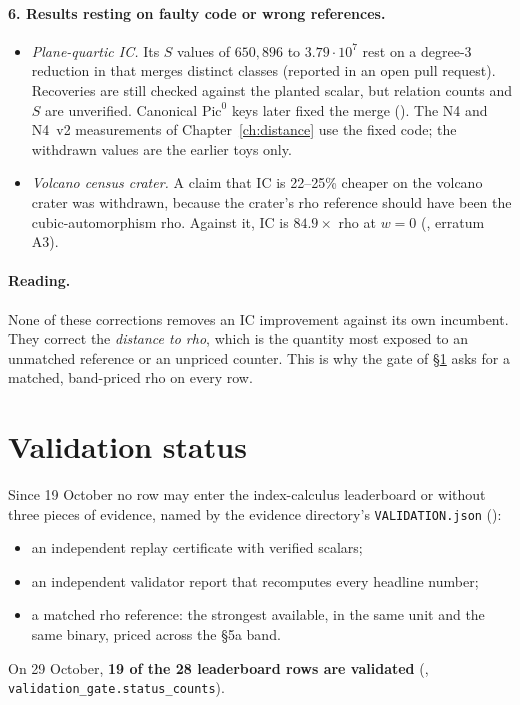 \paragraph{6. Results resting on faulty code or wrong references.}
\begin{itemize}
\item \emph{Plane-quartic IC.} Its $S$ values of $650{,}896$ to
  $3.79\cdot10^7$ rest on a degree-3 reduction in
   that merges
  distinct classes (reported in an open pull request). Recoveries are still
  checked against the planted scalar, but relation counts and $S$ are
  unverified. Canonical $\mathrm{Pic}^0$ keys later fixed the merge
  (). The N4 and N4~v2
  measurements of Chapter~\ref{ch:distance} use the fixed code; the
  withdrawn values are the earlier toys only.
\item \emph{Volcano census crater.} A claim that IC is 22--25\% cheaper on
  the volcano crater was withdrawn, because the crater's rho reference
  should have been the cubic-automorphism rho. Against it, IC is
  $84.9\times$ rho at $w=0$
  (, erratum A3).
\end{itemize}

\paragraph{Reading.} None of these corrections removes an IC improvement
against its own incumbent. They correct the \emph{distance to rho}, which
is the quantity most exposed to an unmatched reference or an unpriced
counter. This is why the gate of \S\ref{sec:gate} asks for a matched,
band-priced rho on every row.

\section{Validation status}\label{sec:gate}

Since 19 October no row may enter the index-calculus leaderboard or
 without three pieces of evidence, named by the
evidence directory's \texttt{VALIDATION.json}
():
\begin{itemize}
\item an independent replay certificate with verified scalars;
\item an independent validator report that recomputes every headline
  number;
\item a matched rho reference: the strongest available, in the same unit
  and the same binary, priced across the §5a band.
\end{itemize}
On 29 October, \textbf{19 of the 28 leaderboard rows are validated}
(, \texttt{validation\_gate.status\_counts}).

